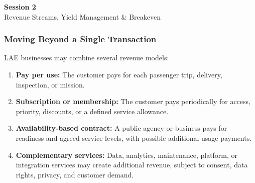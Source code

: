\documentclass{beamer}
\begin{document}
\begin{frame}[c]
  \begin{center}
    \huge\color{cuhkpurple}\textbf{Session 2}\\
    \vspace{0.5cm}
    \Large Revenue Streams, Yield Management \& Breakeven
  \end{center}
\end{frame}

\begin{frame}[t]
  \frametitle{Moving Beyond a Single Transaction}
  LAE businesses may combine several revenue models:
  \begin{enumerate}
    \item \textbf{Pay per use:} The customer pays for each passenger trip, delivery, inspection, or mission.
    \item \textbf{Subscription or membership:} The customer pays periodically for access, priority, discounts, or a defined service allowance.
    \item \textbf{Availability-based contract:} A public agency or business pays for readiness and agreed service levels, with possible additional usage payments.
    \item \textbf{Complementary services:} Data, analytics, maintenance, platform, or integration services may create additional revenue, subject to consent, data rights, privacy, and customer demand.
  \end{enumerate}
\end{frame}
\end{document}
